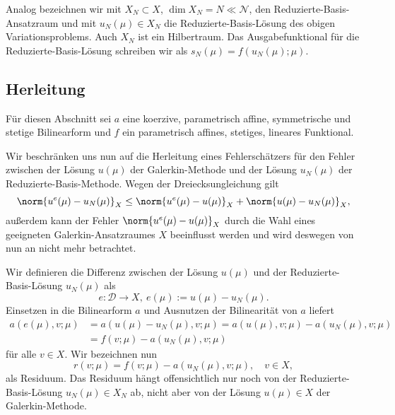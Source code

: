 Analog bezeichnen wir mit $X_N \subset X$, $\dim X_N = N \ll \mathcal N$, den Reduzierte-Basis-Ansatzraum und mit $u_N(\mu) \in X_N$ die Reduzierte-Basis-Lösung des obigen Variationsproblems.
Auch $X_N$ ist ein Hilbertraum.
Das Ausgabefunktional für die Reduzierte-Basis-Lösung schreiben wir als $s_N(\mu) = f(u_N(\mu); \mu)$.

\subsection{Herleitung} %
\label{sub:herleitung}

Für diesen Abschnitt sei $a$ eine koerzive, parametrisch affine, symmetrische und stetige Bilinearform und $f$ ein parametrisch affines, stetiges, lineares Funktional.

Wir beschränken uns nun auf die Herleitung eines Fehlerschätzers für den Fehler zwischen der Lösung $u(\mu)$ der Galerkin-Methode und der Lösung $u_N(\mu)$ der Reduzierte-Basis-Methode. Wegen der Dreiecksungleichung gilt
\begin{equation}
    \norm{u^e(\mu) - u_N(\mu)}_X \leq \norm{u^e(\mu) - u(\mu)}_X + \norm{u(\mu) - u_N(\mu)}_X,
\end{equation}
außerdem kann der Fehler $\norm{u^e(\mu) - u(\mu)}_X$ durch die Wahl eines geeigneten Galerkin-Ansatzraumes $X$ beeinflusst werden und wird deswegen von nun an nicht mehr betrachtet.

Wir definieren die Differenz zwischen der Lösung $u(\mu)$ und der Reduzierte-Basis-Lösung $u_N(\mu)$ als
\begin{equation}
    \label{eq:fehler_fe_und_rb_lsg}
    e \colon \mathcal D \to X, ~
    e(\mu) := u(\mu) - u_N(\mu).
\end{equation}
Einsetzen in die Bilinearform $a$ und Ausnutzen der Bilinearität von $a$ liefert
\begin{align}
    a(e(\mu), v; \mu)
    &= a(u(\mu) - u_N(\mu), v; \mu)
    = a(u(\mu), v; \mu) - a(u_N(\mu), v; \mu) \\
    &= f(v; \mu) - a(u_N(\mu), v; \mu)
\end{align}
für alle $v \in X$.
Wir bezeichnen nun
\begin{equation}
    \label{eq:def_residuum}
    r(v; \mu) = f(v; \mu) - a(u_N(\mu), v; \mu), \quad v \in X,
\end{equation}
als Residuum.
Das Residuum hängt offensichtlich nur noch von der Reduzierte-Basis-Lösung $u_N(\mu) \in X_N$ ab, nicht aber von der Lösung $u(\mu) \in X$ der Galerkin-Methode.


